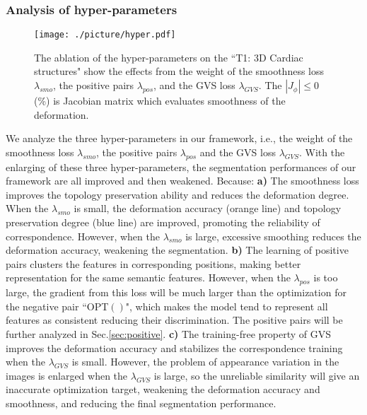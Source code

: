 \subsubsection{Analysis of hyper-parameters}
\begin{figure}
  \centering
  \texttt{[image: ./picture/hyper.pdf]}
  \caption{The ablation of the hyper-parameters on the ``T1: 3D Cardiac structures" show the effects from the weight of the smoothness loss $\lambda_{smo}$, the positive pairs $\lambda_{pos}$, and the GVS loss $\lambda_{GVS}$. The $|J_{\phi}|\leq0$ (\%) is  Jacobian matrix  \cite{he2021few} which evaluates smoothness of the deformation.}\label{Fig:hyper}
\end{figure}
We analyze the three hyper-parameters in our framework, i.e., the weight of the smoothness loss $\lambda_{smo}$, the positive pairs  $\lambda_{pos}$ and the GVS loss $\lambda_{GVS}$. With the enlarging of these three hyper-parameters, the segmentation performances of our framework are all improved and then weakened. Because: \textbf{a)} The smoothness loss improves the topology preservation ability and reduces the deformation degree. When the $\lambda_{smo}$ is small, the deformation accuracy (orange line) and topology preservation degree (blue line) are improved, promoting the reliability of correspondence. However, when the $\lambda_{smo}$ is large, excessive smoothing reduces the deformation accuracy, weakening the segmentation. \textbf{b)} The learning of positive pairs clusters the features in corresponding positions, making better representation for the same semantic features. However, when the $\lambda_{pos}$ is too large, the gradient from this loss will be much larger than the optimization for the negative pair ``OPT$()$", which makes the model tend to represent all features as consistent reducing their discrimination. The positive pairs will be further analyzed in Sec.\ref{sec:positive}. \textbf{c)} The training-free property of GVS improves the deformation accuracy and stabilizes the correspondence training when the $\lambda_{GVS}$ is small. However, the problem of appearance variation in the images is enlarged when the $\lambda_{GVS}$ is large, so the unreliable similarity will give an inaccurate optimization target, weakening the deformation accuracy and smoothness, and reducing the final segmentation performance. %

